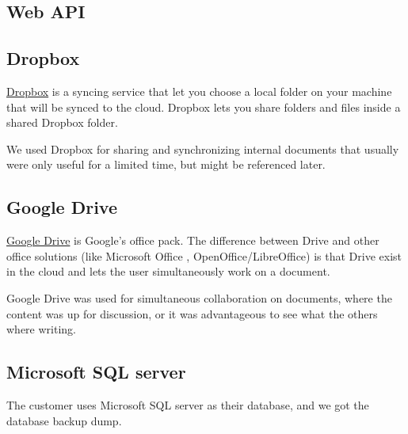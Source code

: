 \documentclass[12pt, a4paper]{article}
\begin{document}
\subsection{Web API}

\subsection{Dropbox}
\href{http://www.dropbox.com}{Dropbox} is a syncing service that let you choose a local folder on your machine that will be synced to the cloud. Dropbox lets you share folders and files inside a shared Dropbox folder.

We used Dropbox for sharing and synchronizing internal documents that usually were only useful for a limited time, but might be referenced later.

\subsection{Google Drive}
\href{https://drive.google.com/}{Google Drive} is Google's office pack. The difference between Drive and other office solutions (like Microsoft Office , OpenOffice/LibreOffice) is that Drive exist in the cloud and lets the user simultaneously work on a document.

Google Drive was used for simultaneous collaboration on documents, where the content was up for discussion, or it was advantageous to see what the others where writing.

\subsection{Microsoft SQL server}
The customer uses Microsoft SQL server as their database, and we got the database backup dump. %
\end{document}
